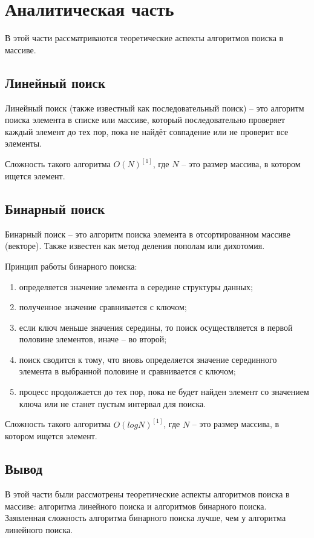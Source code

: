 \documentclass{article}
\begin{document}
\clearpage\section{Аналитическая часть}
В этой части рассматриваются теоретические аспекты алгоритмов поиска в массиве.

\subsection{Линейный поиск}
Линейный поиск (также известный как последовательный поиск) -- это алгоритм поиска элемента в списке или массиве,
который последовательно проверяет каждый элемент до тех пор, пока не найдёт совпадение или не проверит все элементы.

Сложность такого алгоритма $O(N)^{[1]}$, где $N$ -- это размер массива, в котором ищется элемент. 

\subsection{Бинарный поиск}
Бинарный поиск -- это алгоритм поиска элемента в отсортированном массиве (векторе). Также известен как метод деления 
пополам или дихотомия.

Принцип работы бинарного поиска:
\begin{enumerate}
	\item определяется значение элемента в середине структуры данных;
	\item полученное значение сравнивается с ключом;
	\item если ключ меньше значения середины, то поиск осуществляется в первой половине элементов, иначе -- во второй;
	\item поиск сводится к тому, что вновь определяется значение серединного элемента в выбранной половине и 
сравнивается с ключом;
	\item процесс продолжается до тех пор, пока не будет найден элемент со значением ключа или не станет пустым интервал 
для поиска. 
\end{enumerate}

Сложность такого алгоритма $O(logN)^{[1]}$, где $N$ -- это размер массива, в котором ищется элемент. 

\subsection{Вывод}
В этой части были рассмотрены теоретические аспекты алгоритмов поиска в массиве: алгоритма линейного поиска и
алгоритмов бинарного поиска. Заявленная сложность алгоритма бинарного поиска лучше, чем у алгоритма линейного поиска.
\end{document}
